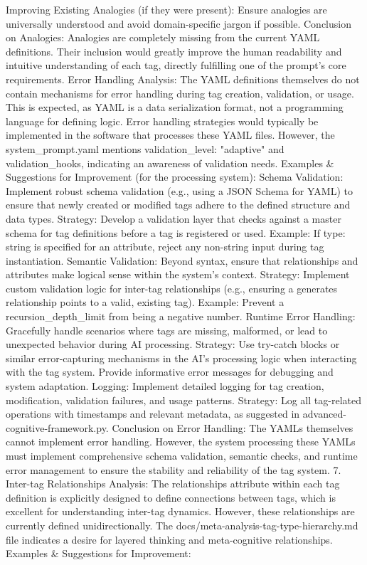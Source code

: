 Improving Existing Analogies (if they were present): Ensure analogies are universally understood and avoid domain-specific jargon if possible. Conclusion on Analogies: Analogies are completely missing from the current YAML definitions. Their inclusion would greatly improve the human readability and intuitive understanding of each tag, directly fulfilling one of the prompt's core requirements.
Error Handling Analysis: The YAML definitions themselves do not contain mechanisms for error handling during tag creation, validation, or usage. This is expected, as YAML is a data serialization format, not a programming language for defining logic. Error handling strategies would typically be implemented in the software that processes these YAML files. However, the system_prompt.yaml mentions validation_level: "adaptive" and validation_hooks, indicating an awareness of validation needs. Examples & Suggestions for Improvement (for the processing system):
Schema Validation: Implement robust schema validation (e.g., using a JSON Schema for YAML) to ensure that newly created or modified tags adhere to the defined structure and data types.
Strategy: Develop a validation layer that checks against a master schema for tag definitions before a tag is registered or used.
Example: If type: string is specified for an attribute, reject any non-string input during tag instantiation.
Semantic Validation: Beyond syntax, ensure that relationships and attributes make logical sense within the system's context.
Strategy: Implement custom validation logic for inter-tag relationships (e.g., ensuring a generates relationship points to a valid, existing tag).
Example: Prevent a recursion_depth_limit from being a negative number.
Runtime Error Handling: Gracefully handle scenarios where tags are missing, malformed, or lead to unexpected behavior during AI processing.
Strategy: Use try-catch blocks or similar error-capturing mechanisms in the AI's processing logic when interacting with the tag system. Provide informative error messages for debugging and system adaptation.
Logging: Implement detailed logging for tag creation, modification, validation failures, and usage patterns.
Strategy: Log all tag-related operations with timestamps and relevant metadata, as suggested in advanced-cognitive-framework.py. Conclusion on Error Handling: The YAMLs themselves cannot implement error handling. However, the system processing these YAMLs must implement comprehensive schema validation, semantic checks, and runtime error management to ensure the stability and reliability of the tag system. 7. Inter-tag Relationships Analysis: The relationships attribute within each tag definition is explicitly designed to define connections between tags, which is excellent for understanding inter-tag dynamics. However, these relationships are currently defined unidirectionally. The docs/meta-analysis-tag-type-hierarchy.md file indicates a desire for layered thinking and meta-cognitive relationships. Examples & Suggestions for Improvement:
